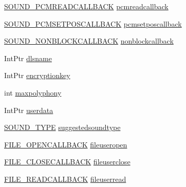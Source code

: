 \begin{DoxyCompactItemize}
\item 
\hyperlink{namespace_f_m_o_d_a18d6e3099b43340594b358d71a50af80}{S\+O\+U\+N\+D\+\_\+\+P\+C\+M\+R\+E\+A\+D\+C\+A\+L\+L\+B\+A\+CK} \hyperlink{struct_f_m_o_d_1_1_c_r_e_a_t_e_s_o_u_n_d_e_x_i_n_f_o_a10ad40fdd1ecd63d3797ea66d66e80d0}{pcmreadcallback}
\item 
\hyperlink{namespace_f_m_o_d_a93c01c9130331e86b54d0461c65c0c54}{S\+O\+U\+N\+D\+\_\+\+P\+C\+M\+S\+E\+T\+P\+O\+S\+C\+A\+L\+L\+B\+A\+CK} \hyperlink{struct_f_m_o_d_1_1_c_r_e_a_t_e_s_o_u_n_d_e_x_i_n_f_o_ad4aa122aff826e6665ca07edfac74f1d}{pcmsetposcallback}
\item 
\hyperlink{namespace_f_m_o_d_abfb747f8aa8ba3087d69eeb201052f2c}{S\+O\+U\+N\+D\+\_\+\+N\+O\+N\+B\+L\+O\+C\+K\+C\+A\+L\+L\+B\+A\+CK} \hyperlink{struct_f_m_o_d_1_1_c_r_e_a_t_e_s_o_u_n_d_e_x_i_n_f_o_ace1b7dfa20c6c9a1d3baf73c8b67055c}{nonblockcallback}
\item 
Int\+Ptr \hyperlink{struct_f_m_o_d_1_1_c_r_e_a_t_e_s_o_u_n_d_e_x_i_n_f_o_afc1a8b2cc49b6fafa61b03ae9c3d2d80}{dlsname}
\item 
Int\+Ptr \hyperlink{struct_f_m_o_d_1_1_c_r_e_a_t_e_s_o_u_n_d_e_x_i_n_f_o_ad688334838d57c1de8003757066ff6b0}{encryptionkey}
\item 
int \hyperlink{struct_f_m_o_d_1_1_c_r_e_a_t_e_s_o_u_n_d_e_x_i_n_f_o_a8841363d865e5f6e53b32f179d12fc28}{maxpolyphony}
\item 
Int\+Ptr \hyperlink{struct_f_m_o_d_1_1_c_r_e_a_t_e_s_o_u_n_d_e_x_i_n_f_o_a83788bafd6bae818692e619d5e6c2493}{userdata}
\item 
\hyperlink{namespace_f_m_o_d_a46aa34a9d7b9a92de83721cd8fbfa028}{S\+O\+U\+N\+D\+\_\+\+T\+Y\+PE} \hyperlink{struct_f_m_o_d_1_1_c_r_e_a_t_e_s_o_u_n_d_e_x_i_n_f_o_a4099635b0725de9a7b1ea48997293199}{suggestedsoundtype}
\item 
\hyperlink{namespace_f_m_o_d_a6aacb40c0bfa3448934de11beb9ed447}{F\+I\+L\+E\+\_\+\+O\+P\+E\+N\+C\+A\+L\+L\+B\+A\+CK} \hyperlink{struct_f_m_o_d_1_1_c_r_e_a_t_e_s_o_u_n_d_e_x_i_n_f_o_a4315be56c0fb2c35639595a709af2317}{fileuseropen}
\item 
\hyperlink{namespace_f_m_o_d_ae4fc590f93bf7202703858219d3b2fbd}{F\+I\+L\+E\+\_\+\+C\+L\+O\+S\+E\+C\+A\+L\+L\+B\+A\+CK} \hyperlink{struct_f_m_o_d_1_1_c_r_e_a_t_e_s_o_u_n_d_e_x_i_n_f_o_ab51d7f8ddcff9812e7705093ba7e7aa0}{fileuserclose}
\item 
\hyperlink{namespace_f_m_o_d_a074a94c39aa2d2569a57ed255f6c9011}{F\+I\+L\+E\+\_\+\+R\+E\+A\+D\+C\+A\+L\+L\+B\+A\+CK} \hyperlink{struct_f_m_o_d_1_1_c_r_e_a_t_e_s_o_u_n_d_e_x_i_n_f_o_a1bb0c7350fefebcd89b3c058b764b8fc}{fileuserread}

\end{DoxyCompactItemize}
